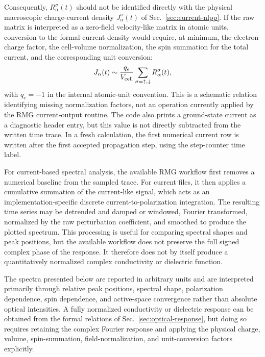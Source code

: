 Consequently, $R_\alpha^\sigma(t)$ should not be identified directly
with the physical macroscopic charge-current density
$J_\alpha^\sigma(t)$ of Sec.~\ref{sec:current-nlpp}.  If the raw
matrix is interpreted as a zero-field velocity-like matrix in atomic
units, conversion to the formal current density would require, at
minimum, the electron-charge factor, the cell-volume normalization,
the spin summation for the total current, and the corresponding unit
conversion:
\begin{equation}
  J_\alpha(t)
  \sim
  \frac{q_e}{V_{\rm cell}}
  \sum_{\sigma=\uparrow,\downarrow}
  R_\alpha^\sigma(t),
  \label{eq:impl_raw_to_current_schematic}
\end{equation}
with $q_e=-1$ in the internal atomic-unit convention.  This is a
schematic relation identifying missing normalization factors, not an
operation currently applied by the RMG current-output routine.  The
code also prints a ground-state current as a diagnostic header entry,
but this value is not directly subtracted from the written time trace.
In a fresh calculation, the first numerical current row is written
after the first accepted propagation step, using the step-counter time
label.

For current-based spectral analysis, the available RMG workflow first
removes a numerical baseline from the sampled trace.  For current
files, it then applies a cumulative summation of the current-like
signal, which acts as an implementation-specific discrete
current-to-polarization integration.  The resulting time series may be
detrended and damped or windowed, Fourier transformed, normalized by
the raw perturbation coefficient, and smoothed to produce the plotted
spectrum.  This processing is useful for comparing spectral shapes and
peak positions, but the available workflow does not preserve the full
signed complex phase of the response.  It therefore does not by itself
produce a quantitatively normalized complex conductivity or dielectric
function.

The spectra presented below are reported in arbitrary units and are
interpreted primarily through relative peak positions, spectral shape,
polarization dependence, spin dependence, and active-space convergence
rather than absolute optical intensities.  A fully normalized
conductivity or dielectric response can be obtained from the formal
relations of Sec.~\ref{sec:optical-response}, but doing so requires
retaining the complex Fourier response and applying the physical
charge, volume, spin-summation, field-normalization, and unit-conversion
factors explicitly.
